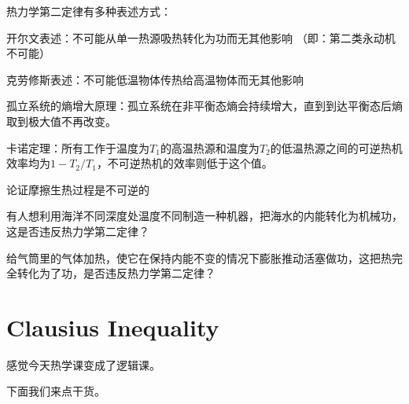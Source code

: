 \documentclass[CJK]{beamer}
\begin{document}
\begin{frame}
\bch
热力学第二定律有多种表述方式：
\bitem
\item{开尔文表述：不可能从单一热源吸热转化为功而无其他影响 （即：第二类永动机不可能）}
\item{克劳修斯表述：不可能低温物体传热给高温物体而无其他影响}
\item{孤立系统的熵增大原理：孤立系统在非平衡态熵会持续增大，直到到达平衡态后熵取到极大值不再改变。}
\item{卡诺定理：所有工作于温度为$T_1$的高温热源和温度为$T_2$的低温热源之间的可逆热机效率均为$1-T_2/T_1$，不可逆热机的效率则低于这个值。}
\eitem
\ech
\end{frame}


\begin{frame}
\bch


\bitem
\item{论证摩擦生热过程是不可逆的}
\eitem

\ech
\end{frame}

\begin{frame}
\bch


\bitem
\item{有人想利用海洋不同深度处温度不同制造一种机器，把海水的内能转化为机械功，这是否违反热力学第二定律？}
\eitem

\ech
\end{frame}


\begin{frame}
\bch


\bitem
\item{给气筒里的气体加热，使它在保持内能不变的情况下膨胀推动活塞做功，这把热完全转化为了功，是否违反热力学第二定律？}
\eitem
\ech
\end{frame}

\section{Clausius Inequality}

\begin{frame}
\bch
\wulian 感觉今天热学课变成了逻辑课。

\skiplines

下面我们来点干货。
\ech
\end{frame}
\end{document}
